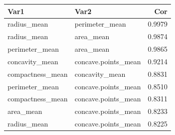 \begin{tabular}{llr}
\toprule
Var1 & Var2 & Cor \\
\midrule
radius\_mean & perimeter\_mean & 0.9979 \\
radius\_mean & area\_mean & 0.9874 \\
perimeter\_mean & area\_mean & 0.9865 \\
concavity\_mean & concave.points\_mean & 0.9214 \\
compactness\_mean & concavity\_mean & 0.8831 \\
perimeter\_mean & concave.points\_mean & 0.8510 \\
compactness\_mean & concave.points\_mean & 0.8311 \\
area\_mean & concave.points\_mean & 0.8233 \\
radius\_mean & concave.points\_mean & 0.8225 \\
\bottomrule
\end{tabular}
